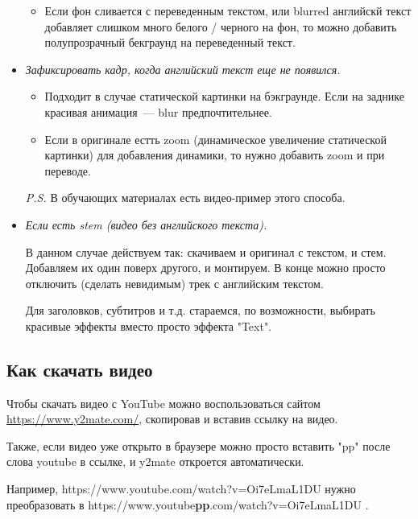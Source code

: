 \documentclass[
a4paper, %
12pt, %
article,
onecolumn, %
openany, %
]{memoir}
\begin{document}
\begin{itemize}
\begin{itemize}
            \item Если фон сливается с переведенным текстом,
                или blurred английскй текст
                добавляет слишком много белого / черного на фон, то
                можно добавить полупрозрачный бекграунд на переведенный текст.
        \end{itemize}

    \item \emph{Зафиксировать кадр, когда английский текст еще не появился.}

        \begin{itemize}
            \item Подходит в случае статической картинки на бэкграунде. Если
                на заднике красивая анимация~--- blur предпочтительнее.

            \item Если в оригинале естть zoom (динамическое увеличение
                статической картинки) для добавления динамики, то нужно
                добавить zoom и при переводе.

        \end{itemize}
        \textit{P.S.} В обучающих материалах есть видео-пример этого способа.

    \item \emph{Если есть stem (видео без английского текста).}

        В данном случае действуем так: скачиваем и оригинал с текстом,
        и стем. Добавляем их один поверх другого, и монтируем. В конце
        можно просто отключить (сделать невидимым) трек
        с английским текстом.

        Для заголовков, субтитров и т.д. стараемся, по возможности,
        выбирать красивые эффекты вместо просто эффекта "Text".
\end{itemize}

\subsection{Как скачать видео}
Чтобы скачать видео с YouTube можно воспользоваться сайтом
\href{https://www.y2mate.com/}{https://www.y2mate.com/}, скопировав и вставив
ссылку на видео.

Также, если видео уже открыто в браузере можно просто вставить "pp" после
слова youtube в ссылке, и y2mate откроется автоматически.

Например, https://www.youtube.com/watch?v=Oi7eLmaL1DU нужно преобразовать
в https://www.youtube\textbf{pp}.com/watch?v=Oi7eLmaL1DU .
\end{document}

